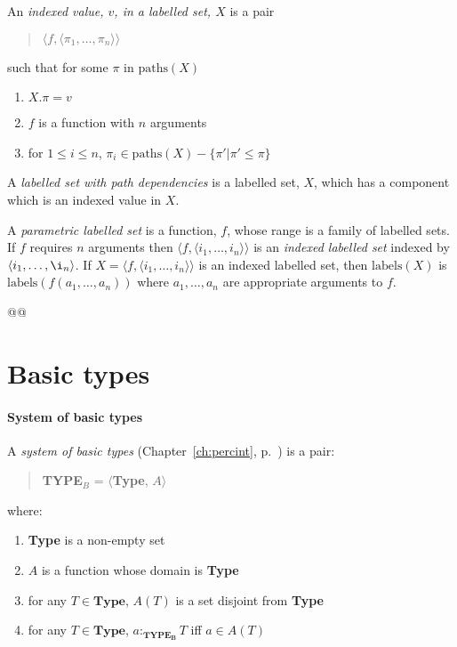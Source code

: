An \textit{indexed value, $v$, in a labelled set, $X$} is a pair
\begin{quote}
  $\langle f,\langle\pi_1,\ldots,\pi_n\rangle\rangle$
\end{quote}
such that for some $\pi$ in $\mathrm{paths}(X)$
\begin{enumerate}
  
\item $X.\pi=v$
  
\item $f$ is a function with $n$ arguments
  
\item for $1\leq i\leq n$,
  $\pi_i\in\mathrm{paths}(X)-\{\pi'|\pi'\leq\pi\}$
\end{enumerate}

A \textit{labelled set with path dependencies} is a labelled set, $X$,
which has a component which is an indexed value in $X$.

A \textit{parametric labelled set} is a function, $f$, whose range is
a family of labelled sets.  If $f$ requires $n$ arguments then
$\langle f, \langle i_1,\ldots,i_n\rangle\rangle$ is an
\textit{indexed labelled set} indexed by $\langle
i_1,\ldots,\i_n\rangle$.  If $X=\langle f, \langle
i_1,\ldots,i_n\rangle\rangle$ is an indexed labelled set, then
$\mathrm{labels}(X)$ is $\mathrm{labels}(f(a_1,\ldots,a_n))$ where
$a_1,\ldots,a_n$ are appropriate arguments to $f$. 

@@



\section{Basic types}
\label{sec:basic}

\paragraph{System of basic types} \mbox{}

A {\it system of basic types\/} (Chapter~\ref{ch:percint}, p.~\pageref{ex:def-basic-types}) is a pair:
\begin{quote}
{\bf TYPE$_B$} = $\langle${\bf Type}, $A$$\rangle$
\end{quote}
where:
\begin{enumerate} 
 
\item \textbf{Type} is a non-empty set 
 
\item $A$ is a function whose domain is \textbf{Type}

\item for any $T\in\textbf{Type}$, $A(T)$ is a set disjoint from
  \textbf{Type}

\item for any $T\in\textbf{Type}$, $a:_{\mathbf{TYPE_B}}T$ iff $a\in A(T)$
 
\end{enumerate}



